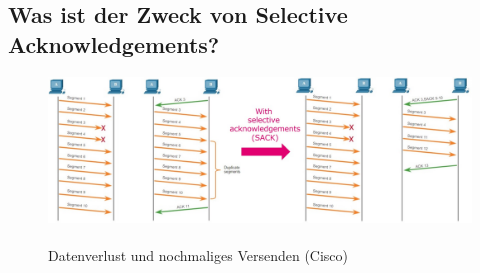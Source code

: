 \subsection*{Was ist der Zweck von \flqq{}Selective Acknowledgements\frqq?}
\begin{figure}[H]
    \begin{center}
    \label{pic:SelectiveAcknowledgement}
    \includegraphics[width=\textwidth]{images/Selective_Acknowledgement.jpg}
    \caption{Datenverlust und nochmaliges Versenden (\textsuperscript{\textcopyright}Cisco)}
    \end{center}
\end{figure}
